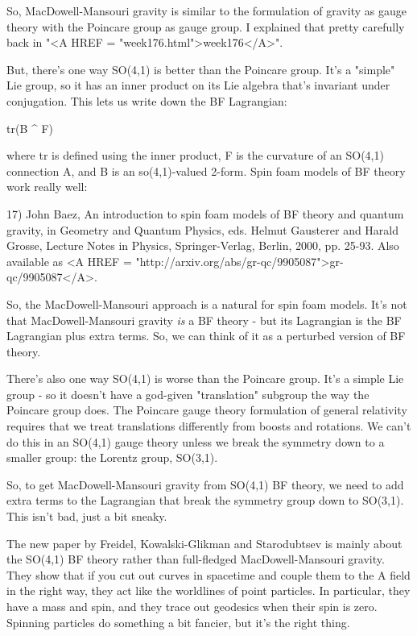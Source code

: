 So, MacDowell-Mansouri gravity is similar to the formulation of
gravity as gauge theory with the Poincare group as gauge group.  I
explained that pretty carefully back in "<A HREF =
"week176.html">week176</A>".

But, there's one way SO(4,1) is better than the Poincare group.  
It's a "simple" Lie group, so it has an inner product on its Lie 
algebra that's invariant under conjugation.  This lets us write down 
the BF Lagrangian:

tr(B ^ F)

where tr is defined using the inner product, F is the curvature of 
an SO(4,1) connection A, and B is an so(4,1)-valued 2-form.  Spin 
foam models of BF theory work really well:

17) John Baez, An introduction to spin foam models of BF theory and 
quantum gravity, in Geometry and Quantum Physics, eds. Helmut 
Gausterer and Harald Grosse, Lecture Notes in Physics, 
Springer-Verlag, Berlin, 2000, pp. 25-93.  Also available as 
<A HREF = "http://arxiv.org/abs/gr-qc/9905087">gr-qc/9905087</A>.

So, the MacDowell-Mansouri approach is a natural for spin foam
models.  It's not that MacDowell-Mansouri gravity \emph{is} a BF theory -
but its Lagrangian is the BF Lagrangian plus extra terms.  So, 
we can think of it as a perturbed version of BF theory.  

There's also one way SO(4,1) is worse than the Poincare group.  
It's a simple Lie group - so it doesn't have a god-given 
"translation" subgroup the way the Poincare group does.  The 
Poincare gauge theory formulation of general relativity requires 
that we treat translations differently from boosts and rotations.  
We can't do this in an SO(4,1) gauge theory unless we break the 
symmetry down to a smaller group: the Lorentz group, SO(3,1).

So, to get MacDowell-Mansouri gravity from SO(4,1) BF theory, 
we need to add extra terms to the Lagrangian that break the 
symmetry group down to SO(3,1).  This isn't bad, just a bit sneaky.

The new paper by Freidel, Kowalski-Glikman and Starodubtsev is 
mainly about the SO(4,1) BF theory rather than full-fledged
MacDowell-Mansouri gravity.  They show that if you cut out
curves in spacetime and couple them to the A field in the right 
way, they act like the worldlines of point particles.  In particular, 
they have a mass and spin, and they trace out geodesics when their 
spin is zero.  Spinning particles do something a bit fancier, but it's 
the right thing.

